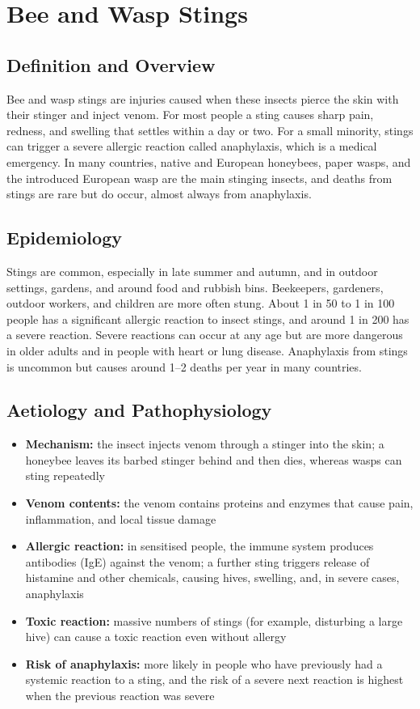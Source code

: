 \chapter{Bee and Wasp Stings}

\section*{Definition and Overview}
Bee and wasp stings are injuries caused when these insects pierce the skin with their stinger and inject venom. For most people a sting causes sharp pain, redness, and swelling that settles within a day or two. For a small minority, stings can trigger a severe allergic reaction called anaphylaxis, which is a medical emergency. In many countries, native and European honeybees, paper wasps, and the introduced European wasp are the main stinging insects, and deaths from stings are rare but do occur, almost always from anaphylaxis.

\section*{Epidemiology}
Stings are common, especially in late summer and autumn, and in outdoor settings, gardens, and around food and rubbish bins. Beekeepers, gardeners, outdoor workers, and children are more often stung. About 1 in 50 to 1 in 100 people has a significant allergic reaction to insect stings, and around 1 in 200 has a severe reaction. Severe reactions can occur at any age but are more dangerous in older adults and in people with heart or lung disease. Anaphylaxis from stings is uncommon but causes around 1--2 deaths per year in many countries.

\section*{Aetiology and Pathophysiology}
\begin{itemize}
    \item \textbf{Mechanism:} the insect injects venom through a stinger into the skin; a honeybee leaves its barbed stinger behind and then dies, whereas wasps can sting repeatedly
    \item \textbf{Venom contents:} the venom contains proteins and enzymes that cause pain, inflammation, and local tissue damage
    \item \textbf{Allergic reaction:} in sensitised people, the immune system produces antibodies (IgE) against the venom; a further sting triggers release of histamine and other chemicals, causing hives, swelling, and, in severe cases, anaphylaxis
    \item \textbf{Toxic reaction:} massive numbers of stings (for example, disturbing a large hive) can cause a toxic reaction even without allergy
    \item \textbf{Risk of anaphylaxis:} more likely in people who have previously had a systemic reaction to a sting, and the risk of a severe next reaction is highest when the previous reaction was severe
\end{itemize}

